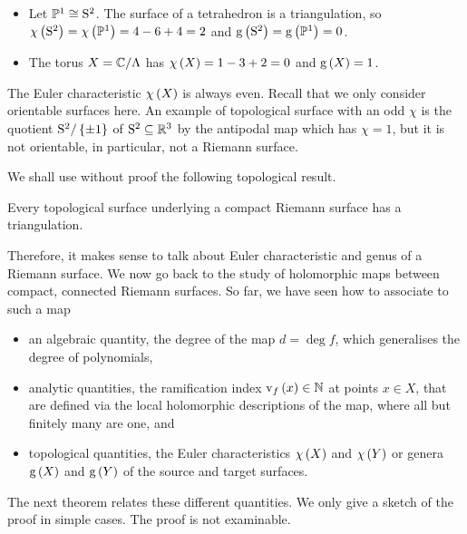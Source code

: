 \begin{example*}
\hfill
\begin{itemize}
\item Let $ \mathbb{P}^1 \cong \mathrm{S}^2 $. The surface of a tetrahedron is a triangulation, so $ \chi\br{\S^2} = \chi\br{\PP^1} = 4 - 6 + 4 = 2 $ and $ \g\br{\S^2} = \g\br{\PP^1} = 0 $.
\item The torus $ X = \mathbb{C} / \Lambda $ has $ \chi\br{X} = 1 - 3 + 2 = 0 $ and $ \g\br{X} = 1 $.
\end{itemize}
\end{example*}

\begin{remark}
The Euler characteristic $ \chi\br{X} $ is always even. Recall that we only consider orientable surfaces here. An example of topological surface with an odd $ \chi $ is the quotient $ \S^2 / \cbr{\pm 1} $ of $ \mathrm{S}^2 \subseteq \mathbb{R}^3 $ by the antipodal map which has $ \chi = 1 $, but it is not orientable, in particular, not a Riemann surface.
\end{remark}

We shall use without proof the following topological result.

\begin{theorem}
Every topological surface underlying a compact Riemann surface has a triangulation.
\end{theorem}


Therefore, it makes sense to talk about Euler characteristic and genus of a Riemann surface. We now go back to the study of holomorphic maps between compact, connected Riemann surfaces. So far, we have seen how to associate to such a map
\begin{itemize}
\item an algebraic quantity, the degree of the map $ d = \deg f $, which generalises the degree of polynomials,
\item analytic quantities, the ramification index $ \v_f\br{x} \in \NN $ at points $ x \in X $, that are defined via the local holomorphic descriptions of the map, where all but finitely many are one, and
\item topological quantities, the Euler characteristics $ \chi\br{X} $ and $ \chi\br{Y} $ or genera $ \g\br{X} $ and $ \g\br{Y} $ of the source and target surfaces.
\end{itemize}
The next theorem relates these different quantities. We only give a sketch of the proof in simple cases. The proof is not examinable.

